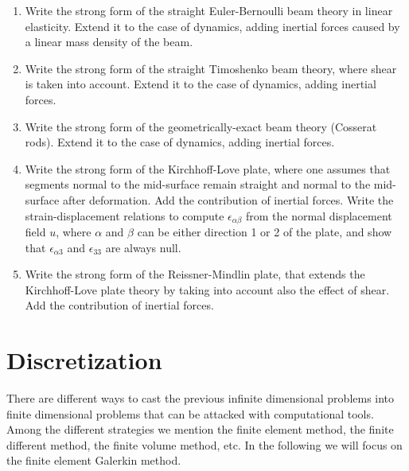\documentclass{digitaldynamics}
\begin{document}
{
\small

\begin{enumerate}
	
	\item Write the strong form of the straight Euler-Bernoulli beam theory in linear elasticity. Extend it to the case of dynamics, adding inertial forces caused by a linear mass density of the beam.
	
	\item Write the strong form of the straight Timoshenko beam theory, where shear is taken into account. Extend it to the case of dynamics, adding inertial forces.
	
	\item Write the strong form of the geometrically-exact beam theory (Cosserat rods).  Extend it to the case of dynamics, adding inertial forces.
	
	\item Write the strong form of the Kirchhoff-Love plate, where one assumes that segments normal to the mid-surface remain straight and normal to the mid-surface after deformation. Add the contribution of inertial forces. 
	Write the strain-displacement relations to compute $\epsilon_{\alpha\beta}$ from the normal displacement field $u$, where $\alpha$ and $\beta$ can be either direction 1 or 2 of the plate, and show that $\epsilon_{\alpha 3}$ and $\epsilon_{33}$ are always null.
	
	\item Write the strong form of the Reissner-Mindlin plate, that extends the Kirchhoff-Love plate theory by taking into account also the effect of shear. Add the contribution of inertial forces.
	
\end{enumerate}

}





\newpage
\section{Discretization}

There are different ways to cast the previous infinite dimensional problems into finite dimensional problems that can be attacked with computational tools. Among the different strategies we mention the finite element method, the finite different method, the finite volume method, etc. In the following we will focus on the finite element Galerkin method.
\end{document}
